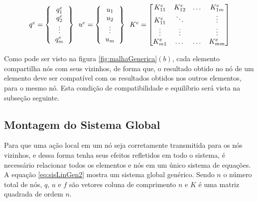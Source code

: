 \documentclass[
    12pt,               %
    openright,          %
    oneside,
    a4paper,            %
    english,            %
    french,             %
    spanish,            %
    brazil              %
    ]{abntex2}
\begin{document}
  \begin{equation}
     \label{eq:assembly}
     \begin{tabular}{c c c}
     $q^e = 
         \left \{
         \begin{tabular}{c}
             $q^e_1$ \\
             $q^e_2$ \\
             \vdots \\
             $q^e_m$
         \end{tabular}       
         \right \}$
         \
     $u^e = 
         \left \{
         \begin{tabular}{c}
             $u_1$ \\
             $u_2$ \\
             \vdots \\
             $u_m$
         \end{tabular}       
         \right \}   $
         \
         $K^e =
         \begin{bmatrix}
             K^e_{11}    & K^e_{12}  & \dots     & K^e_{1m} \\
             K^e_{11}    & \ddots  & \   & \vdots \\
             \vdots  & \vdots     & \    & \vdots \\
             K^e_{m1}    & \dots   & \dots   & K^e_{mm} 
         \end{bmatrix}    $      
     \end{tabular} 
  \end{equation}
  
  
Como pode ser visto na figura \ref{fig:malhaGenerica}$(b)$, cada elemento compartilha nós com seus vizinhos, de forma que, o resultado obtido no nó de um elemento deve ser compatível com os resultados obtidos nos outros elementos, para o mesmo nó. Esta condição de compatibilidade e equilíbrio será vista na subseção seguinte.
 
 \subsection{Montagem do Sistema Global}
 
Para que uma ação local em um nó seja corretamente transmitida para os nós vizinhos, e dessa forma tenha seus efeitos refletidos em todo o sistema, é necessário relacionar todos os elementos e nós em um único sistema de equações. A equação \ref{eq:sisLinGen2} mostra um sistema global genérico. Sendo $n$ o número total de nós, $q$, $u$ e $f$ são vetores coluna de comprimento $n$ e $K$ é uma matriz quadrada de ordem $n$.
\end{document}

